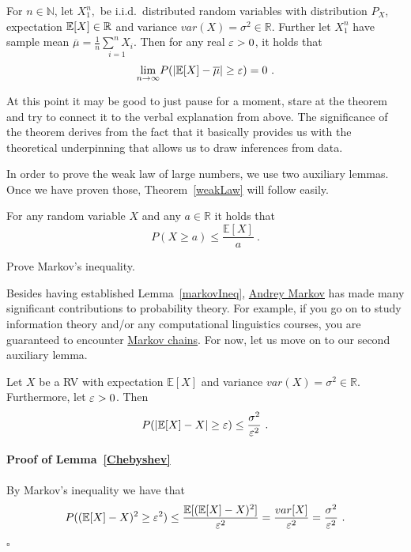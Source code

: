 \begin{Theorem}\label{weakLaw}
For $n \in \mathbb{N}$, let $X_{1}^{n},$ be  i.i.d.\ distributed random variables with distribution $ P_{X} $, expectation $ \mathbb{E}[X] \in \mathbb{R} $
and variance $ var(X) = \sigma^{2} \in \mathbb{R} $. Further let
$ X_{1}^{n} $ have sample mean $ \overline{\mu} = \frac{1}{n} \underset{i=1}{\overset{n}{\sum}X_{i}} $. Then for any real $ \varepsilon > 0 $, it holds that 
$$ \underset{n \rightarrow \infty}{\lim}P(|\mathbb{E}[X] - \overline{\mu}| \geq \eps) = 0 \ . $$
\end{Theorem}

At this point it may be good to just pause for a moment, stare at the theorem and try to connect it to the verbal explanation from above. The significance of the theorem
derives from the fact that it basically provides us with the theoretical underpinning that allows us to draw inferences from data.

In order to prove the weak law of large numbers, we use two auxiliary lemmas. Once we have proven those, Theorem~\ref{weakLaw} will follow easily. 

\begin{Lemma}\label{markovIneq}
For any random variable $ X $ and any $ a \in \mathbb{R} $ it holds that
$$ P(X \geq a) \leq \dfrac{\mathbb{E}[X]}{a} \ . $$
\end{Lemma}

\begin{Exercise}
Prove Markov's inequality.
\end{Exercise}

Besides having established Lemma~\ref{markovIneq}, \href{https://en.wikipedia.org/wiki/Andrey_Markov}{Andrey Markov} has made many significant contributions to
probability theory. For example, if you go on to study information theory and/or any computational linguistics courses, you are guaranteed to encounter \href{https://en.wikipedia.org/wiki/Markov_chain}{Markov chains}. For now, let us move on to our second auxiliary lemma.

\begin{Lemma}\label{Chebyshev}
Let $ X $ be a RV with expectation $ \mathbb{E}[X] $ and variance $ var(X) = \sigma^{2} \in \mathbb{R} $. Furthermore, let $ \varepsilon > 0 $. Then
$$ P( \left|\mathbb{E}[X] - X \right| \geq \varepsilon) \leq \dfrac{\sigma^{2}}{\varepsilon^{2}} \ . $$ 
\end{Lemma}

\paragraph{Proof of Lemma~\ref{Chebyshev}} 
By Markov's inequality we have that
\begin{equation}
P((\mathbb{E}[X] - X)^{2} \geq \varepsilon^{2}) \leq \frac{\mathbb{E}[(\mathbb{E}[X]-X)^2]}{\varepsilon^2} = \dfrac{var[X]}{\varepsilon^{2}} = \dfrac{\sigma^{2}}{\varepsilon^{2}} \ .
\end{equation}  
\hfill $ \square $ \bigskip

